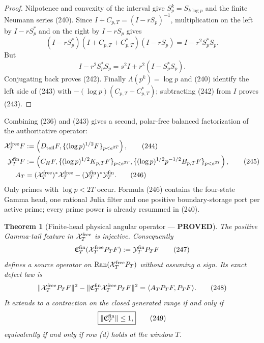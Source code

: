 \documentclass[11pt]{article}
\newtheorem{theorem}{Theorem}
\newcommand{\PROVED}{\textcolor{green!45!black}{\textbf{PROVED}}}
\newcommand{\Ran}{\operatorname{Ran}}
\begin{document}
\begin{proof}
Nilpotence and convexity of the interval give $S_p^k=S_{k\log p}$ and the
finite Neumann series (240).  Since
$I+C_{p,T}=(I-rS_p)^{-1}$, multiplication on the left by
$I-rS_p^*$ and on the right by $I-rS_p$ gives
\[
 (I-rS_p^*)(I+C_{p,T}+C_{p,T}^*)(I-rS_p)
 =I-r^2S_p^*S_p.
\]
But
\[
 I-r^2S_p^*S_p=s^2I+r^2(I-S_p^*S_p).
\]
Conjugating back proves (242).  Finally
$\Lambda(p^k)=\log p$ and (240) identify the left side of (243) with
$-(\log p)(C_{p,T}+C_{p,T}^*)$; subtracting (242) from $I$ proves (243).
\end{proof}

Combining (236) and (243) gives a second, polar-free balanced factorization
of the authoritative operator:
\begin{align}
 \mathcal X_T^{\rm free}F
 &:=\left(D_{\rm tail}F,
          \{(\log p)^{1/2}F\}_{p<e^{2T}}\right),      \tag{244}\\
 \mathcal Y_T^{\rm fin}F
 &:=\left(C_HF,
   \{(\log p)^{1/2}K_{p,T}F\}_{p<e^{2T}},
   \{(\log p)^{1/2}p^{-1/2}B_{p,T}F\}_{p<e^{2T}}
          \right),                                   \tag{245}\\
 A_T&=(\mathcal X_T^{\rm free})^*\mathcal X_T^{\rm free}
     -(\mathcal Y_T^{\rm fin})^*\mathcal Y_T^{\rm fin}. \tag{246}
\end{align}
Only primes with $\log p<2T$ occur.  Formula (246) contains the four-state
Gamma head, one rational Julia filter and one positive boundary-storage port
per active prime; every prime power is already resummed in (240).

\begin{theorem}[Finite-head physical angular operator --- \PROVED]
The positive Gamma-tail feature in $\mathcal X_T^{\rm free}$ is injective.
Consequently
\begin{equation}
 \mathfrak C_T^{\rm fin}
   (\mathcal X_T^{\rm free}P_TF)
 :=\mathcal Y_T^{\rm fin}P_TF                         \tag{247}
\end{equation}
defines a source operator on
$\Ran(\mathcal X_T^{\rm free}P_T)$ without assuming a sign.  Its exact
defect law is
\begin{equation}
 \|\mathcal X_T^{\rm free}P_TF\|^2
 -\|\mathfrak C_T^{\rm fin}\mathcal X_T^{\rm free}P_TF\|^2
 =\langle A_TP_TF,P_TF\rangle.                       \tag{248}
\end{equation}
It extends to a contraction on the closed generated range if and only if
\begin{equation}
 \boxed{\|\mathfrak C_T^{\rm fin}\|\le1,}             \tag{249}
\end{equation}
equivalently if and only if row (d) holds at the window $T$.
\end{theorem}
\end{document}
